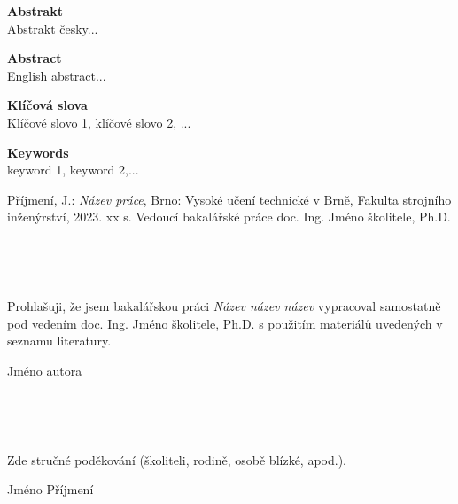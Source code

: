 \documentclass[a4paper,12pt,twoside]{article}
\theoremstyle{definition}
\theoremstyle{remark}
\numberwithin{equation}{section}
\numberwithin{table}{section}
\numberwithin{figure}{section}
\begin{document}
\newpage
\thispagestyle{empty}
\noindent
{\bf Abstrakt}\\[1mm]
Abstrakt česky...

\vspace{1cm}\noindent
{\bf Abstract}\\[1mm]
English abstract...

\vspace{1cm}
\noindent
{\bf Klíčová slova}\\
Klíčové slovo 1, klíčové slovo 2, ...

\vspace{1cm}
\noindent
{\bf Keywords}\\
keyword 1, keyword 2,...

\vfill\noindent
Příjmení, J.: {\it Název práce}, Brno: Vysoké učení technické v Brně, Fakulta strojního inženýrství, 2023. xx s. Vedoucí bakalářské práce doc. Ing. Jméno školitele, Ph.D.

\newpage
\thispagestyle{empty}
\

\newpage
\thispagestyle{empty}

\

\vspace{15cm}\noindent Prohlašuji, že jsem bakalářskou práci {\it
Název název název} vypracoval samostatně pod
vedením doc. Ing. Jméno školitele, Ph.D. s použitím materiálů uvedených
v seznamu literatury.

\vspace{1cm}
\hfill{Jméno autora}

\newpage
\thispagestyle{empty}
\

\newpage
\thispagestyle{empty}

\

\vspace{18cm}\noindent Zde stručné poděkování (školiteli, rodině, osobě blízké, apod.). 

\vspace{1cm}
\hfill{Jméno Příjmení}

\newpage
\thispagestyle{empty}
\
\end{document}
